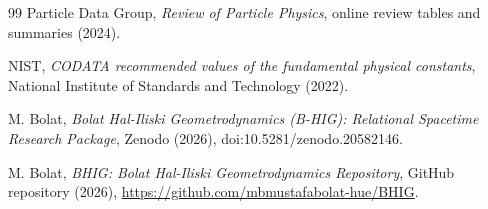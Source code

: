 \documentclass[11pt,a4paper]{article}
\begin{document}
\begin{thebibliography}{99}
Particle Data Group, \emph{Review of Particle Physics}, online review tables and summaries (2024).

NIST, \emph{CODATA recommended values of the fundamental physical constants}, National Institute of Standards and Technology (2022).

M. Bolat, \emph{Bolat Hal-Iliski Geometrodynamics (B-HIG): Relational Spacetime Research Package}, Zenodo (2026), doi:10.5281/zenodo.20582146.

M. Bolat, \emph{BHIG: Bolat Hal-Iliski Geometrodynamics Repository}, GitHub repository (2026), \url{https://github.com/mbmustafabolat-hue/BHIG}.

\end{thebibliography}
\end{document}

